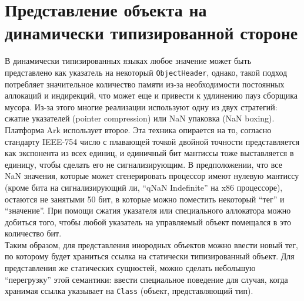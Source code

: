 \documentclass[times,specification,annotation]{itmo-student-thesis}
\begin{document}
\section{Представление объекта на динамически типизированной стороне}
В динамически типизированных языках любое значение может быть представлено как указатель на некоторый \texttt{ObjectHeader}, однако, такой подход потребляет значительное количество памяти из-за необходимости постоянных аллокаций и индирекций, что может еще и привести к удлинению пауз сборщика мусора. Из-за этого многие реализации используют одну из двух стратегий: сжатие указателей (pointer compression) или NaN упаковка (NaN boxing). Платформа Ark использует второе. Эта техника опирается на то, согласно стандарту IEEE-754 число с плавающей точкой двойной точности представляется как экспонента из всех единиц, и единичный бит мантиссы тоже выставляется в единицу, чтобы сделать его не сигнализирующим. В предположении, что все NaN значения, которые может сгенерировать процессор имеют нулевую мантиссу (кроме бита на сигнализирующий ли, ``qNaN Indefinite'' на x86 процессоре), остаются не занятыми 50 бит, в которые можно поместить некоторый ``тег'' и ``значение''. При помощи сжатия указателя или специального аллокатора можно добиться того, чтобы любой указатель на управляемый объект помещался в это количество бит.\\
Таким образом, для представления инородных объектов можно ввести новый тег, по которому будет храниться ссылка на статически типизированный объект. Для представления же статических сущностей, можно сделать небольшую ``перегрузку'' этой семантики: ввести специальное поведение для случая, когда хранимая ссылка указывает на \texttt{Class} (объект, представляющий тип).
\end{document}
